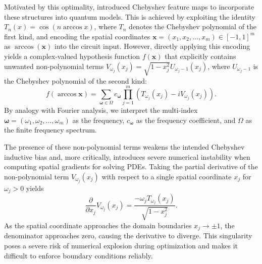 \documentclass[%
 reprint,
 amsmath,amssymb,
 aps,
 pra,
]{revtex4-2}
\theoremstyle{definition}
\begin{document}
Motivated by this optimality, \citet{Kyriienko_2021} introduced Chebyshev feature maps to incorporate these structures into quantum models. This is achieved by exploiting the identity \(T_n(x)=\cos(n\arccos x)\), where \(T_n\) denotes the Chebyshev polynomial of the first kind, and encoding the spatial coordinates \(\boldsymbol{x}=(x_1, x_2, \dots, x_m) \in [-1, 1]^m\) as \(\arccos(\boldsymbol{x})\) into the circuit input. However, directly applying this encoding yields a complex-valued hypothesis function \(f(\boldsymbol{x})\) that explicitly contains unwanted non-polynomial terms \(V_{\omega_j}(x_j) = \sqrt{1-x_j^2}U_{\omega_j-1}(x_j)\), where \(U_{\omega_j-1}\) is the Chebyshev polynomial of the second kind:
\begin{equation}
f(\arccos \boldsymbol{x})=
\sum_{\boldsymbol{\omega}\in\Omega} c_{\boldsymbol{\omega}}
\prod_{j=1}^m \left( T_{\omega_j}(x_j) - i V_{\omega_j}(x_j) \right).
\end{equation}
By analogy with Fourier analysis, we interpret the multi-index \(\boldsymbol{\omega}=(\omega_1,\omega_2,\dots,\omega_m)\) as the frequency, \(c_{\boldsymbol{\omega}}\) as the frequency coefficient, and \(\Omega\) as the finite frequency spectrum.

The presence of these non-polynomial terms weakens the intended Chebyshev inductive bias and, more critically, introduces severe numerical instability when computing spatial gradients for solving PDEs. Taking the partial derivative of the non-polynomial term \(V_{\omega_j}(x_j)\) with respect to a single spatial coordinate \(x_j\) for \(\omega_j > 0\) yields
\begin{equation}
\frac{\partial}{\partial x_j} V_{\omega_j}(x_j) = \frac{-\omega_j T_{\omega_j}(x_j)}{\sqrt{1-x_j^2}}.
\end{equation}
As the spatial coordinate approaches the domain boundaries \(x_j \to \pm 1\), the denominator approaches zero, causing the derivative to diverge. This singularity poses a severe risk of numerical explosion during optimization and makes it difficult to enforce boundary conditions reliably.
\end{document}
